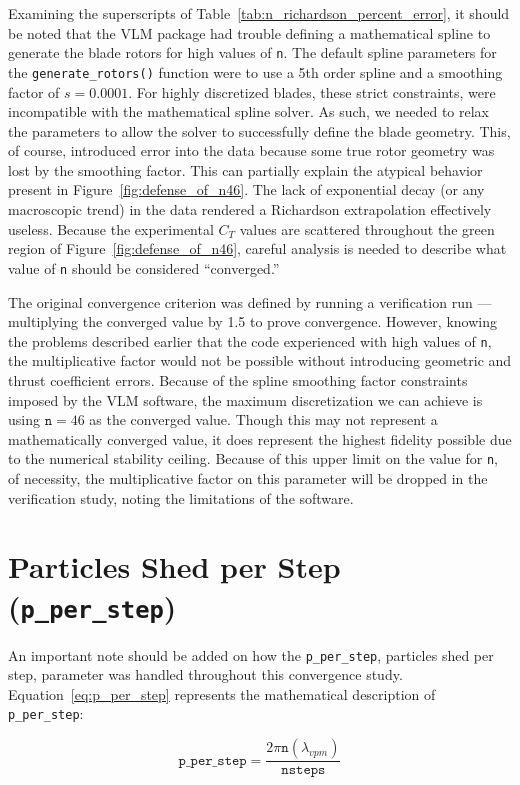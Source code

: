 \documentclass{article}
\begin{document}
Examining the superscripts of Table~\ref{tab:n_richardson_percent_error}, it should be noted that the VLM package had trouble defining a mathematical spline to generate the blade rotors for high values of \texttt{n}.
The default spline parameters for the \texttt{generate\_rotors()} function were to use a 5th order spline and a smoothing factor of $s = 0.0001$. For highly discretized blades, these strict constraints, were incompatible with the mathematical spline solver. As such, we needed to relax the parameters to allow the solver to successfully define the blade geometry.
This, of course, introduced error into the data because some true rotor geometry was lost by the smoothing factor. This can partially explain the atypical behavior present in Figure~\ref{fig:defense_of_n46}.
The lack of exponential decay (or any macroscopic trend) in the data rendered a Richardson extrapolation effectively useless.
Because the experimental $C_T$ values are scattered throughout the green region of Figure~\ref{fig:defense_of_n46}, careful analysis is needed to describe what value of \texttt{n} should be considered ``converged.''

The original convergence criterion was defined by running a verification run --- multiplying the converged value by 1.5 to prove convergence.
However, knowing the problems described earlier that the code experienced with high values of \texttt{n}, the multiplicative factor would not be possible without introducing geometric and thrust coefficient errors.
Because of the spline smoothing factor constraints imposed by the VLM software, the maximum discretization we can achieve is using $\texttt{n} = 46$ as the converged value. Though this may not represent a mathematically converged value, it does represent the highest fidelity possible due to the numerical stability ceiling.
Because of this upper limit on the value for \texttt{n}, of necessity, the multiplicative factor on this parameter will be dropped in the verification study, noting the limitations of the software.


\section{Particles Shed per Step (\texttt{p\_per\_step})}
An important note should be added on how the \texttt{p\_per\_step}, particles shed per step, parameter was handled throughout this convergence study.
Equation~\ref{eq:p_per_step} represents the mathematical description of \texttt{p\_per\_step}:


\begin{equation}\label{eq:p_per_step}
\texttt{p\_per\_step} = \frac{2 \pi \texttt{n} (\lambda_{vpm})}{\texttt{nsteps}}
\end{equation}
\end{document}
